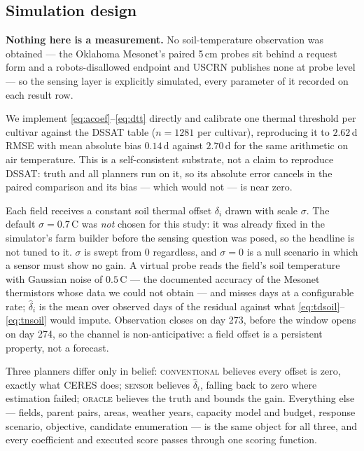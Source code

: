 \subsection{Simulation design}

\textbf{Nothing here is a measurement.} No soil-temperature observation was
obtained --- the Oklahoma Mesonet's paired 5\,cm probes sit behind a request
form and a robots-disallowed endpoint and USCRN publishes none at probe
level --- so the sensing layer is explicitly simulated, every parameter of
it recorded on each result row.

We implement \eqref{eq:acoef}--\eqref{eq:dtt} directly and calibrate one
thermal threshold per cultivar against the DSSAT table ($n=1281$ per
cultivar), reproducing it to $2.62$\,d RMSE with mean absolute bias
$0.14$\,d against $2.70$\,d for the same arithmetic on air temperature.
This is a self-consistent substrate, not a claim to reproduce DSSAT: truth
and all planners run on it, so its absolute error cancels in the paired
comparison and its bias --- which would not --- is near zero.

Each field receives a constant soil thermal offset $\delta_i$ drawn with
scale $\sigma$. The default $\sigma=0.7$\,\textdegree C was \emph{not}
chosen for this study: it was already fixed in the simulator's farm builder
before the sensing question was posed, so the headline is not tuned to it.
$\sigma$ is swept from $0$ regardless, and $\sigma=0$ is a null scenario in
which a sensor must show no gain. A virtual probe reads the field's soil
temperature with Gaussian noise of $0.5$\,\textdegree C --- the documented
accuracy of the Mesonet thermistors whose data we could not obtain --- and
misses days at a configurable rate; $\hat\delta_i$ is the mean over observed
days of the residual against what \eqref{eq:tdsoil}--\eqref{eq:tnsoil} would
impute. Observation closes on day 273, before the window opens on day 274,
so the channel is non-anticipative: a field offset is a persistent property,
not a forecast.

Three planners differ only in belief: \textsc{conventional} believes every
offset is zero, exactly what CERES does; \textsc{sensor} believes
$\hat\delta_i$, falling back to zero where estimation failed;
\textsc{oracle} believes the truth and bounds the gain. Everything else ---
fields, parent pairs, areas, weather years, capacity model and budget,
response scenario, objective, candidate enumeration --- is the same object
for all three, and every coefficient and executed score passes through one
scoring function.

